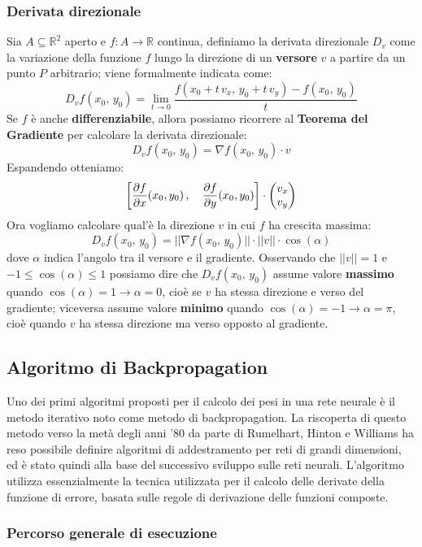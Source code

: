 \subsubsection{Derivata direzionale}
Sia $A\subseteq\mathbb{R}^2$ aperto e $f:A\to\mathbb{R}$ continua, definiamo la derivata direzionale $D_v$ come la variazione della funzione $f$ lungo la direzione di un \textbf{versore} $v$ a partire da un punto $P$ arbitrario; viene formalmente indicata come:
\[
D_vf(x_0,\,y_0)=\lim_{t\to 0}\frac{f(x_0+t\,v_x,\,y_0+t\,v_y)-f(x_0,\,y_0)}{t}
\]
Se $f$ è anche \textbf{differenziabile}, allora possiamo ricorrere al \textbf{Teorema del Gradiente} per calcolare la derivata direzionale:
\[
D_vf(x_0,\,y_0)=\nabla f(x_0,\,y_0)\cdot v
\]
Espandendo otteniamo:
\[
\left[\frac{\partial f}{\partial x}(x_0,y_0)\,, \quad\frac{\partial f}{\partial y}(x_0,y_0)\right]\cdot \def\arraystretch{1.0} \begin{pmatrix}
	v_x \\ v_y
\end{pmatrix}
\]
Ora vogliamo calcolare qual'è la direzione $v$ in cui $f$ ha crescita massima:
\[
D_vf(x_0,\,y_0)=||\nabla f(x_0,\,y_0)||\cdot||v||\cdot\cos(\alpha)
\]
dove $\alpha$ indica l'angolo tra il versore e il gradiente. Osservando che $||v||=1$ e $-1\le\cos(\alpha)\le 1$ possiamo dire che $D_vf(x_0,\,y_0)$ assume valore \textbf{massimo} quando $\cos(\alpha)=1\to\alpha=0$, cioè se $v$ ha stessa direzione e verso del gradiente; viceversa assume valore \textbf{minimo} quando $\cos(\alpha)=-1\to\alpha=\pi$, cioè quando $v$ ha stessa direzione ma verso opposto al gradiente.

\subsection{Algoritmo di Backpropagation}
Uno dei primi algoritmi proposti per il calcolo dei pesi in una rete neurale è il metodo iterativo noto come metodo di backpropagation. La riscoperta di questo metodo verso la metà degli anni '80 da parte di Rumelhart, Hinton e Williams \cite{rumelhart1986backprop} ha reso possibile definire algoritmi di addestramento per reti di grandi dimensioni, ed è stato quindi alla base del successivo sviluppo sulle reti neurali. L'algoritmo utilizza essenzialmente la tecnica utilizzata per il calcolo delle derivate della funzione di errore, basata sulle regole di derivazione delle funzioni composte.

\subsubsection{Percorso generale di esecuzione}

